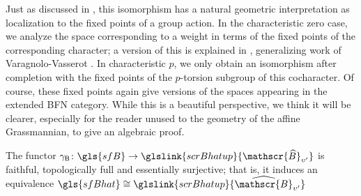 \begin{remark}
  Just as discussed in \cite{WebSD}, this isomorphism has a natural
  geometric interpretation as localization to the fixed points of a
  group action.  In the characteristic zero case, we analyze the space
  corresponding to a weight in terms of the fixed points of the
  corresponding character; a version of this is explained in
  \cite{WebGT}, generalizing work of Varagnolo-Vasserot \cite[\S
  2]{MR3013034}. In characteristic $p$, we only obtain an isomorphism
  after completion with the fixed points of the $p$-torsion subgroup
  of this cocharacter.  Of course, these fixed points again give
  versions of the spaces appearing in the extended BFN category.
  While this is a beautiful perspective, we think it will be clearer,
  especially for the reader unused to the geometry of the affine
  Grassmannian, to give an algebraic proof.
\end{remark}

  \begin{proposition}\label{prop:B-equiv}
    The functor $\gamma_{\mathsf{B}}\colon \gls{sfB}\to \glslink{scrBhatup}{\mathscr{\widehat{B}}_{\upsilon'}}$ is  faithful, topologically full and essentially surjective; that is, it induces an equivalence $\gls{sfBhat}\cong \glslink{scrBhatup}{\widehat{\mathscr{B}}_{\upsilon'}}$
  \end{proposition}
  
